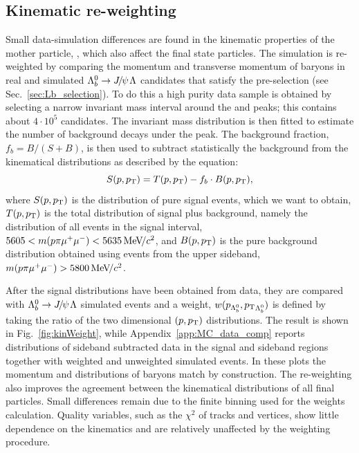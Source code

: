 \subsection{Kinematic re-weighting}
\label{sec:kinWeight}

Small data-simulation differences are found in the kinematic properties of the mother particle, \Lb,
which also affect the final state particles. The simulation is re-weighted by 
comparing the momentum and transverse momentum of \Lb baryons in 
real and simulated $\Lb\to\jpsi\Lz$ candidates that satisfy the pre-selection (see Sec.~\ref{sec:Lb_selection}).
To do this a high purity data sample is obtained by selecting a narrow invariant mass interval around the \jpsi 
and \Lb peaks; this contains about $4\cdot10^5$ candidates.
The \Lb invariant mass distribution is then fitted to estimate the number of background decays under the peak.
The background fraction, $f_b = B/(S+B)$, is then used to subtract statistically 
the background from the kinematical distributions as described by the equation:
%
\begin{equation}
S(p,\mbox{$p_{\rm T}$}) = T(p,\mbox{$p_{\rm T}$}) - f_b\cdot B(p,\mbox{$p_{\rm T}$}),
\end{equation}
\noindent
where $S(p,\mbox{$p_{\rm T}$})$ is the distribution of pure signal events, which we want to obtain, $T(p,\mbox{$p_{\rm T}$})$ is the total
distribution of signal plus background, namely the distribution of all events in the signal interval,
$5605 < m(p\pi\mumu) < 5635 \mevcc$, and $B(p,\mbox{$p_{\rm T}$})$ is the pure background
distribution obtained using events from the upper sideband, $m(p\pi\mumu) > 5800 \mevcc$.

After the signal distributions have been obtained from data, they are compared with \mbox{$\Lb\to\jpsi\Lz$} simulated events
and a weight, $w(p_{{{\Lambda}^0_{b}}},\mbox{$p_{\rm T}$}_{{{\Lambda}^0_{b}}})$ is defined by taking the ratio of the two dimensional $(p,\mbox{$p_{\rm T}$})$ distributions.
The result is shown in Fig.~\ref{fig:kinWeight}, while Appendix~\ref{app:MC_data_comp} reports distributions
of sideband subtracted data in the signal and sideband regions together with weighted and unweighted simulated events.
In these plots the momentum and \pt distributions of \Lb baryons match by construction. The re-weighting also improves the agreement 
between the kinematical distributions of all final particles. Small differences remain due to
the finite binning used for the weights calculation. Quality variables, such as the $\chi^2$ of tracks
and vertices, show little dependence on the kinematics and are relatively unaffected by the weighting procedure.

